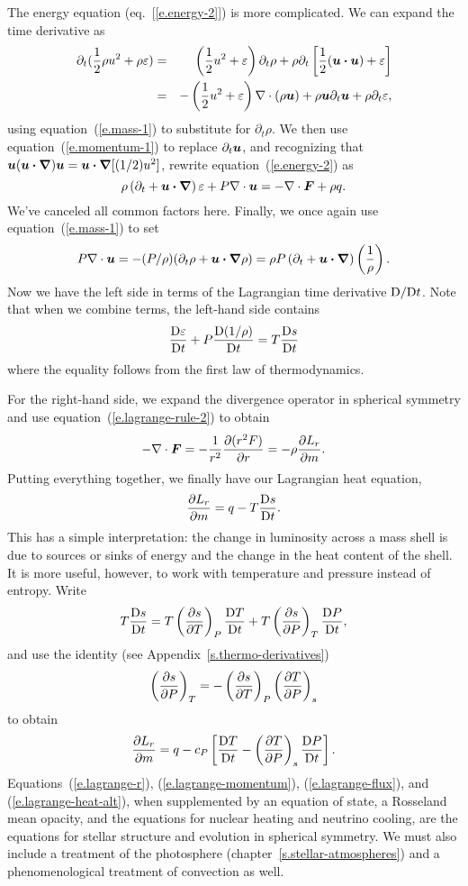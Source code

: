 The energy equation (eq.~[\ref{e.energy-2}]) is more complicated. We can expand the time derivative as
\begin{eqnarray*}
	\partial_{t}(\frac{1}{2}\rho u^{2} + \rho \varepsilon) 
	&=& \left(\frac{1}{2}u^{2} + \varepsilon\right)\partial_{t}\rho + \rho\partial_{t}\left[\frac{1}{2}(\boldsymbol{u}\boldsymbol{\cdot}\boldsymbol{u}) + \varepsilon\right]\\
	&=& -\left(\frac{1}{2}u^{2} + \varepsilon\right)\nabla \cdot\left(\rho\boldsymbol{u}\right) + \rho \boldsymbol{u}\partial_{t}\boldsymbol{u} + \rho\partial_{t}\varepsilon,
\end{eqnarray*}
using equation~(\ref{e.mass-1}) to substitute for $\partial_{t}\rho$.  We then use equation~(\ref{e.momentum-1}) to replace $\partial_{t}\boldsymbol{u}$, and recognizing that $\boldsymbol{u}(\boldsymbol{u}\boldsymbol{\cdot}\boldsymbol{\nabla})\boldsymbol{u} = \boldsymbol{u}\boldsymbol{\cdot}\boldsymbol{\nabla}[(1/2)u^{2}]$, rewrite equation~(\ref{e.energy-2}) as
\[ 
	\rho\left(\partial_{t} + \boldsymbol{u}\boldsymbol{\cdot}\boldsymbol{\nabla}\right) \varepsilon + P\nabla \cdot\boldsymbol{u} = -\nabla \cdot\boldsymbol{F} + \rho q.
\]
We've canceled all common factors here.  Finally, we once again use equation~(\ref{e.mass-1}) to set 
\[
	P\nabla \cdot\boldsymbol{u} = -(P/\rho)(\partial_{t}\rho + \boldsymbol{u}\boldsymbol{\cdot}\boldsymbol{\nabla} \rho) 
	= \rho P\left(\partial_{t} + \boldsymbol{u}\boldsymbol{\cdot}\boldsymbol{\nabla}\right)\left(\frac{1}{\rho}\right).
\]
Now we have the left side in terms of the Lagrangian time derivative $\mathrm{D}/\mathrm{D} t$.  Note that when we combine terms, the left-hand side contains 
\[ \frac{\mathrm{D} \varepsilon}{\mathrm{D} t} + P\frac{\mathrm{D} (1/\rho)}{\mathrm{D} t} = T\frac{\mathrm{D} s}{\mathrm{D} t} \] 
where the equality follows from the first law of thermodynamics.

For the right-hand side, we expand the divergence operator in spherical symmetry and use equation~(\ref{e.lagrange-rule-2}) to obtain
\[
	-\nabla \cdot\boldsymbol{F} = -\frac{1}{r^{2}}\frac{\partial(r^{2} F)}{\partial r} = -\rho\frac{\partial L_{r}}{\partial m}.
\]
Putting everything together, we finally have our Lagrangian heat equation,
\begin{equation}\label{e.lagrange-heat}
	\frac{\partial L_{r}}{\partial m} = q - T\frac{\mathrm{D} s}{\mathrm{D} t}.
\end{equation}
This has a simple interpretation: the change in luminosity across a mass shell is due to sources or sinks of energy and the change in the heat content of the shell.  It is more useful, however, to work with temperature and pressure instead of entropy.  Write
\[
	T\frac{\mathrm{D} s}{\mathrm{D} t} = T\left(\frac{\partial s}{\partial T}\right)_{P}\frac{\mathrm{D} T}{\mathrm{D} t} + T\left(\frac{\partial s}{\partial P}\right)_{T}\frac{\mathrm{D} P}{\mathrm{D} t},
\]
and use the identity (see Appendix~\ref{s.thermo-derivatives})
\[
	\left(\frac{\partial s}{\partial P}\right)_{T} = -\left(\frac{\partial s}{\partial T}\right)_{P}\left(\frac{\partial T}{\partial P}\right)_{s}
\]
to obtain
\begin{equation}\label{e.lagrange-heat-alt}
	\frac{\partial L_{r}}{\partial m} 
	= q - c_{P}\left[ \frac{\mathrm{D} T}{\mathrm{D} t} - \left(\frac{\partial T}{\partial P}\right)_{s} \frac{\mathrm{D} P}{\mathrm{D} t}\right].
\end{equation}
Equations~(\ref{e.lagrange-r}), (\ref{e.lagrange-momentum}), (\ref{e.lagrange-flux}), and (\ref{e.lagrange-heat-alt}), when supplemented by an equation of state, a Rosseland mean opacity, and the equations for nuclear heating and neutrino cooling, are the equations for stellar structure and evolution in spherical symmetry. We must also include a treatment of the photosphere (chapter~\ref{s.stellar-atmospheres}) and a phenomenological treatment of convection as well.
